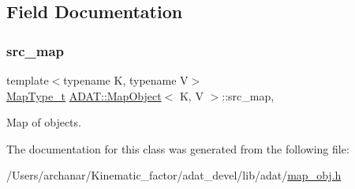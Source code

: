 \subsection{Field Documentation}
\mbox{\label{classADAT_1_1MapObject_af97a2c41e290158ccab37c2e52383194}} 
\subsubsection{\texorpdfstring{src\_map}{src\_map}}
{\footnotesize\ttfamily template$<$typename K, typename V$>$ \\
\mbox{\hyperlink{classADAT_1_1MapObject_ad6a4952087d3de5a43d08b2ea2ad270b}{Map\+Type\+\_\+t}} \mbox{\hyperlink{classADAT_1_1MapObject}{A\+D\+A\+T\+::\+Map\+Object}}$<$ K, V $>$\+::src\+\_\+map\hspace{0.3cm}{\ttfamily [mutable]}, {\ttfamily [protected]}}



Map of objects. 



The documentation for this class was generated from the following file\+:\begin{DoxyCompactItemize}
\item 
/\+Users/archanar/\+Kinematic\+\_\+factor/adat\+\_\+devel/lib/adat/\mbox{\hyperlink{lib_2adat_2map__obj_8h}{map\+\_\+obj.\+h}}\end{DoxyCompactItemize}
